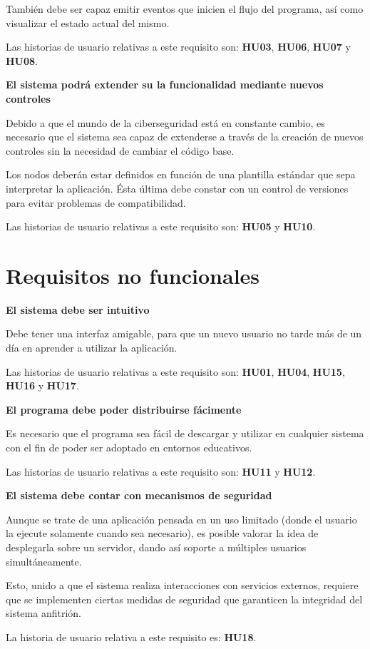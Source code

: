 También debe ser capaz emitir eventos que inicien el flujo del programa, así como visualizar el estado actual del mismo.\sn

Las historias de usuario relativas a este requisito son: \footnotesize\color{black!90}
\textbf{HU03}, \textbf{HU06}, \textbf{HU07} y \textbf{HU08}.
\normalsize\color{black}\n

\newpage
\textbf{El sistema podrá extender su la funcionalidad mediante nuevos controles}\sn

Debido a que el mundo de la ciberseguridad está en constante cambio, es necesario que el sistema sea capaz de extenderse a través de la creación de nuevos controles sin la necesidad de cambiar el código base.\sn

Los nodos deberán estar definidos en función de una plantilla estándar que sepa interpretar la aplicación. Ésta última debe constar con un control de versiones para evitar problemas de compatibilidad.\sn

Las historias de usuario relativas a este requisito son: \footnotesize\color{black!90}
\textbf{HU05} y \textbf{HU10}.
\normalsize\color{black}\n


\section{Requisitos no funcionales} \label{sub:nofuncrequirements}
\vspace{1cm}

\textbf{El sistema debe ser intuitivo}\sn

Debe tener una interfaz amigable, para que un nuevo usuario no tarde más de un día en aprender a utilizar la aplicación.\sn

Las historias de usuario relativas a este requisito son: \footnotesize\color{black!90}
\textbf{HU01}, \textbf{HU04}, \textbf{HU15}, \textbf{HU16} y \textbf{HU17}.
\normalsize\color{black}\n

\textbf{El programa debe poder distribuirse fácimente}\sn

Es necesario que el programa sea fácil de descargar y utilizar en cualquier sistema con el fin de poder ser adoptado en entornos educativos.\sn

Las historias de usuario relativas a este requisito son: \footnotesize\color{black!90}
\textbf{HU11} y \textbf{HU12}.
\normalsize\color{black}\n

\textbf{El sistema debe contar con mecanismos de seguridad}\sn

Aunque se trate de una aplicación pensada en un uso limitado (donde el usuario la ejecute solamente cuando sea necesario), es posible valorar la idea de desplegarla sobre un servidor, dando así soporte a múltiples usuarios simultáneamente.\sn

Esto, unido a que el sistema realiza interacciones con servicios externos, requiere que se implementen ciertas medidas de seguridad que garanticen la integridad del sistema anfitrión.\sn

La historia de usuario relativa a este requisito es: \footnotesize\color{black!90}
\textbf{HU18}.
\normalsize\color{black}\n